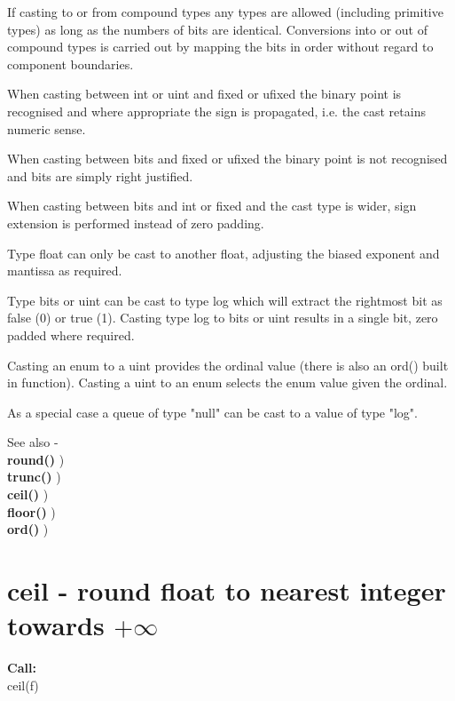         If casting to or from compound types any types are allowed (including
        primitive types) as long as the numbers of bits are identical.
        Conversions into or out of compound types is carried out by mapping
        the bits in order without regard to component boundaries.

        When casting between int or uint and fixed or ufixed the binary
        point is recognised and where appropriate the sign is
        propagated, i.e. the cast retains numeric sense.

        When casting between bits and fixed or ufixed the binary point
        is not recognised and bits are simply right justified.

        When casting between bits and int or fixed and the cast type is
        wider, sign extension is performed instead of zero padding.

        Type float can only be cast to another float, adjusting the
        biased exponent and mantissa as required.

        Type bits or uint can be cast to type log which will extract the
        rightmost bit as false (0) or true (1). Casting type log to bits
        or uint results in a single bit, zero padded where required.

        Casting an enum to a uint provides the ordinal value (there is
        also an ord() built in function). Casting a uint to an enum
        selects the enum value given the ordinal.
        
        As a special case a queue of type "null" can be cast to a value of
        type "log".
        
        See also - \\
        {\bf round()} ) \\
        {\bf trunc()} ) \\
        {\bf ceil()} ) \\
        {\bf floor()} ) \\
        {\bf ord()} )
        


    \section{ceil - round float to nearest integer towards $+\infty$}\label{sec:ifceil}
        
        
        {\bf Call:} \\
        ceil(f)
        
